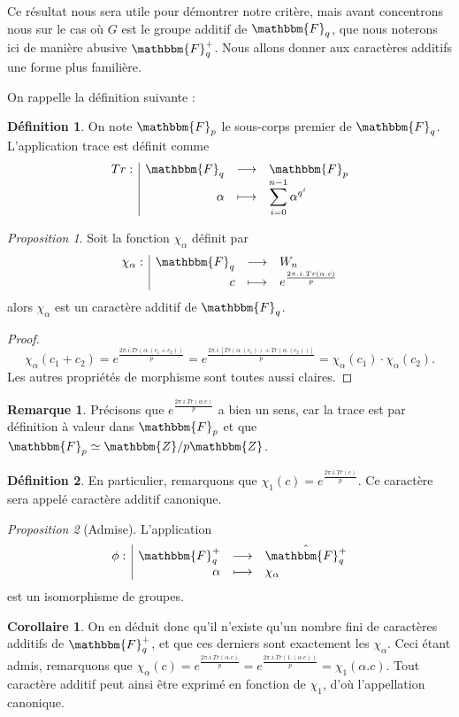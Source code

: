 \documentclass[12pt]{article}
\newcommand{\fonction}[5]{
\begin{displaymath}
\begin{array}{l|rcl}
\displaystyle
#1 : & #2 & \longrightarrow & #3 \\
    & #4 & \longmapsto & #5
\end{array}
\end{displaymath}
}
\theoremstyle{remark}\newtheorem{note}{Note}
\theoremstyle{remark}\newtheorem{nota}{Notation}
\newcommand{\Z}{\mathbbm{Z}}
\newcommand{\Fq}{\mathbbm{F}_q}
\newcommand{\Fp}{\mathbbm{F}_p}
\newtheorem{prop}{Proposition}
\theoremstyle{definition}
\newtheorem{definition}{Définition}
\newtheorem{coro}{Corollaire}
\newtheorem{rem}{Remarque}
\begin{document}
Ce résultat nous sera utile pour démontrer notre critère, mais avant concentrons nous sur le cas où $G$ est le groupe additif de $\Fq$, que nous noterons ici de manière abusive $\Fq^{+}$. Nous allons donner aux caractères additifs une forme plus familière.

\pagebreak

On rappelle la définition suivante :

\begin{definition}
On note $\Fp$ le sous-corps premier de $\Fq$. L'application trace est définit comme \fonction{Tr}{\Fq}{\Fp}{\alpha}{\displaystyle\sum_{i=0}^{n-1} \alpha^{q^i}}
\end{definition}

\begin{prop}
Soit la fonction $\chi_\alpha$ définit par \fonction{\chi_\alpha}{\Fq}{W_n}{c}{e^{\frac{2\pi.i.Tr(\alpha.c)}{p}}} alors $\chi_\alpha$ est un caractère additif de $\Fq$.
\end{prop}

\begin{proof}
$$\chi_\alpha(c_1 + c_2) = e^{\frac{2\pi.i.Tr(\alpha.(c_1 + c_2))}{p}} = e^{\frac{2\pi.i.[Tr(\alpha.(c_1))+Tr(\alpha.(c_2))]}{p}}=\chi_\alpha(c_1)\cdot \chi_\alpha(c_2).$$ Les autres propriétés de morphisme sont toutes aussi claires.
\end{proof}

\begin{rem}
Précisons que $e^{\frac{2\pi.i.Tr(\alpha.c)}{p}}$ a bien un sens, car la trace est par définition à valeur dans $\Fp$ et que $\Fp \simeq \Z / p\Z$.
\end{rem}

\begin{definition}
En particulier, remarquons que $\chi_1(c) = e^{\frac{2\pi.i.Tr(c)}{p}}$. Ce caractère sera appelé caractère additif canonique.
\end{definition}

\begin{prop}[Admise]
L'application \fonction{\phi}{\Fq^+}{\hat{\Fq^+}}{\alpha}{\chi_\alpha} est un isomorphisme de groupes.
\end{prop}

\begin{coro}
On en déduit donc qu'il n'existe qu'un nombre fini de caractères additifs de $\Fq^+$, et que ces derniers sont exactement les $\chi_\alpha$. Ceci étant admis, remarquons que $\chi_\alpha(c) = e^{\frac{2\pi.i.Tr(\alpha.c)}{p}} = e^{\frac{2\pi.i.Tr(1.(\alpha.c))}{p}} = \chi_1(\alpha.c)$. Tout caractère additif peut ainsi être exprimé en fonction de $\chi_1$, d'où l'appellation canonique.
\end{coro}
\end{document}
